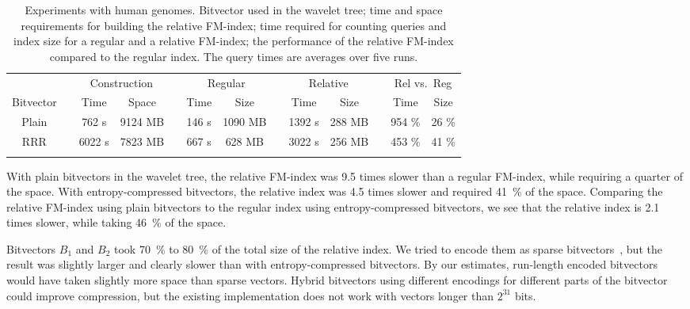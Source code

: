 \documentclass{llncs}
\begin{document}
\begin{table}
\centering
\caption{Experiments with human genomes. Bitvector used in the wavelet tree; time and space requirements for building the relative FM-index; time required for counting queries and index size for a regular and a relative FM-index; the performance of the relative FM-index compared to the regular index. The query times are averages over five runs.}\label{table:experiments}
\begin{tabular}{ccccccccccccc}
\hline
\noalign{\smallskip}
 & & \multicolumn{2}{c}{Construction} & & \multicolumn{2}{c}{Regular} & & \multicolumn{2}{c}{Relative} & & \multicolumn{2}{c}{Rel vs.~Reg} \\
Bitvector & & Time & Space & & Time & Size & & Time & Size & & Time & Size \\
\noalign{\smallskip}
\hline
\noalign{\smallskip}
Plain & &  762 s & 9124 MB & & 146 s & 1090 MB & & 1392 s & 288 MB & & 954 \% & 26 \% \\
\noalign{\smallskip}
RRR   & & 6022 s & 7823 MB & & 667 s &  628 MB & & 3022 s & 256 MB & & 453 \% & 41 \% \\
\noalign{\smallskip}
\hline
\end{tabular}
\end{table}

With plain bitvectors in the wavelet tree, the relative FM-index was 9.5 times slower than a regular FM-index, while requiring a quarter of the space. With entropy-compressed bitvectors, the relative index was 4.5 times slower and required 41~\% of the space. Comparing the relative FM-index using plain bitvectors to the regular index using entropy-compressed bitvectors, we see that the relative index is 2.1 times slower, while taking 46~\% of the space.

Bitvectors $B_{1}$ and $B_{2}$ took 70~\% to 80~\% of the total size of the relative index. We tried to encode them as sparse bitvectors~\cite{Okanohara2007}, but the result was slightly larger and clearly slower than with entropy-compressed bitvectors. By our estimates, run-length encoded bitvectors would have taken slightly more space than sparse vectors. Hybrid bitvectors using different encodings for different parts of the bitvector~\cite{Kaerkkaeinen2014} could improve compression, but the existing implementation does not work with vectors longer than $2^{31}$ bits.
\end{document}
